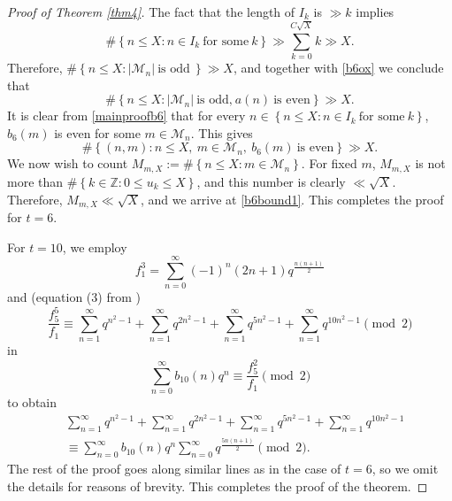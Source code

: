 \documentclass[reqno]{amsart}
\theoremstyle{definition}
\theoremstyle{remark}
\numberwithin{equation}{section}
\begin{document}
\begin{proof}[Proof of Theorem \ref{thm4}]
The fact that the length of $I_{k}$ is $\gg k$ implies
\begin{equation*}
\#\left\lbrace n\leq X :n\in I_k\  \text{for some}\  k\right\rbrace \gg \sum_{k=0}^{C\sqrt{X}}k\gg X.
\end{equation*}
Therefore, $\#\left\lbrace n\leq X :|\mathcal{M}_n|\ \text{is odd}\  \right\rbrace \gg X$, and together with \eqref{b6ox} we conclude that 
\begin{equation*}
\#\left\lbrace n\leq X :|\mathcal{M}_n|\ \text{is odd,}\ a(n)\ \text{is even} \right\rbrace \gg X.
\end{equation*}
It is clear from \eqref{mainproofb6} that for every $n\in \left\lbrace n\leq X :n\in I_k\  \text{for some}\  k\right\rbrace$, $b_6(m)$ is even for some $m\in \mathcal{M}_n$. This gives
\begin{equation*}
\#\left\lbrace(n,m): n\leq X,\ m\in \mathcal{M}_n,\ b_6(m)\ \text{is even} \right\rbrace \gg X.
\end{equation*}
We now wish to count $M_{m, X}:=\#\left\lbrace n\leq X: m\in \mathcal{M}_n \right\rbrace$. For fixed $m$, $M_{m, X}$ is not more than $\#\left\lbrace k\in\mathbb{Z}: 0\leq u_k\leq X \right\rbrace$, and this number is clearly $\ll \sqrt{X}$. 
Therefore, $M_{m, X} \ll \sqrt{X}$, and we arrive at \eqref{b6bound1}. This completes the proof for $t=6$. 
\par 
For $t=10$, we employ 
\begin{equation*}
f^3_1=\sum_{n=0}^{\infty}(-1)^{n}(2n+1)q^{\frac{n(n+1)}{2}}
\end{equation*}
and (equation (3) from \cite{Keith2021})
\begin{equation*}
\frac{f^5_5}{f_1}\equiv \sum_{n=1}^{\infty}q^{n^2-1}+\sum_{n=1}^{\infty}q^{2n^2-1}+\sum_{n=1}^{\infty}q^{5n^2-1}+\sum_{n=1}^{\infty}q^{10n^2-1}\pmod{2}
\end{equation*}
in 
\begin{equation*}
\sum_{n=0}^{\infty}b_{10}(n)q^{n}\equiv \frac{f^{2}_{5}}{f_{1}}\pmod{2}
\end{equation*}
to obtain
\begin{align*}
&\sum_{n=1}^{\infty}q^{n^2-1}+\sum_{n=1}^{\infty}q^{2n^2-1}+\sum_{n=1}^{\infty}q^{5n^2-1}+\sum_{n=1}^{\infty}q^{10n^2-1}\\
&\equiv \sum_{n=0}^{\infty}b_{10}(n)q^{n}\sum_{n=0}^{\infty}q^{\frac{5n(n+1)}{2}}\pmod{2}.
\end{align*} 
The rest of the proof goes along similar lines as in the case of $t=6$, so we omit the details for reasons of brevity. This completes the proof of the theorem.
\end{proof}
\end{document}
